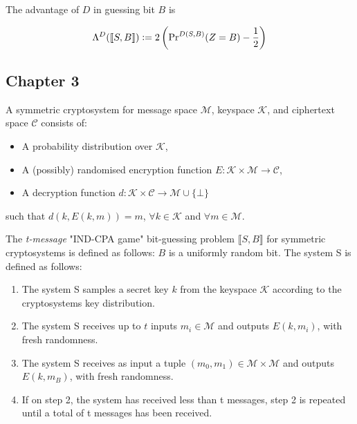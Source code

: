 \documentclass[a4paper,german]{article}
\newenvironment{customdef}[1]{\renewcommand\theinnercustomdef{#1}\innercustomdef}{\endinnercustomdef}
\begin{document}
\begin{customdef}{2.5}
	The advantage of $D$ in guessing bit $B$ is

	\[
		\Lambda^D(\llbracket S,B\rrbracket) \vcentcolon= 2\left( \Pr\nolimits^{D(S,B)}(Z = B) - \frac{1}{2}\right)
	\]
\end{customdef}

\subsection*{Chapter 3}

\begin{customdef}{3.1}
	A symmetric cryptosystem for message space $\mathcal{M}$, keyspace  $\mathcal{K}$, and ciphertext space $\mathcal{C}$ consists of:

	\begin{itemize}

		\item  A probability distribution over $\mathcal{K}$,
		\item  A (possibly) randomised encryption function $E: \mathcal{K} \times \mathcal{M} \rightarrow \mathcal{C}$,
		\item  A decryption function $d: \mathcal{K} \times \mathcal{C} \rightarrow \mathcal{M} \cup \{\bot\}$

	\end{itemize}

	such that $d(k, E(k, m)) = m$, $\forall k \in \mathcal{K}$ and $\forall m \in \mathcal{M}$.
\end{customdef}

\begin{customdef}{3.2}
	The \emph{t-message} "IND-CPA game" bit-guessing problem $\llbracket S, B\rrbracket$ for symmetric cryptosystems is defined as follows: $B$ is a uniformly random bit. The system S is defined as follows:

	\begin{enumerate}

		\item  The system S samples a secret key $k$ from the keyspace $\mathcal{K}$ according to the cryptosystems key distribution.
		\item  The system S receives up to $t$ inputs $m_i \in \mathcal{M}$ and outputs $E(k, m_i)$, with fresh randomness.
		\item  The system S receives as input a tuple $(m_0, m_1) \in \mathcal{M} \times \mathcal{M}$ and outputs  $E(k, m_B)$, with fresh randomness.
		 \item If on step 2, the system has received less than t messages, step 2 is repeated until a total of t messages has been received.

	\end{enumerate}
\end{customdef}
\end{document}
